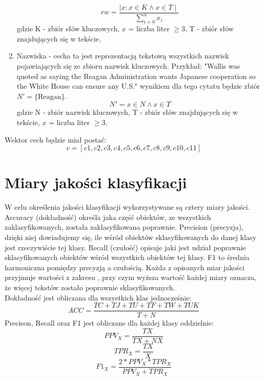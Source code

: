 \documentclass{article}
\begin{document}
\begin{enumerate}
        \begin{equation}
            rw = \frac{ \mid x : x \in K \land x \in T \mid}{ \sum_{i=0}^{n} x_i}
        \end{equation}
       gdzie K - zbiór słów kluczowych, \( x \) = liczba liter \( \geq 3 \), T - zbiór słów znajdujących się w tekście.
    \item Nazwiska - cecha ta jest reprezentacją tekstową wszystkich nazwisk pojawiających się ze zbioru nazwisk kluczowych. Przykład: "Wallis was quoted as saying the Reagan Administration wants Japanese cooperation so the White House can ensure any U.S." wynikiem dla tego cytatu będzie zbiór \( N' = \{ \text{Reagan} \} \).
    \begin{equation}
            N' =  x \in N \land x \in T
        \end{equation}
        gdzie N - zbiór nazwisk kluczowych, T - zbiór słów znajdujących się w tekście, \( x \) = liczba liter \( \geq 3 \).
\end{enumerate}

Wektor cech będzie miał postać: 
        \begin{equation}
          v = [c1, c2, c3, c4, c5, c6, c7, c8, c9, c10, c11]
        \end{equation}


\section{Miary jakości klasyfikacji}
W celu określenia jakości klasyfikacji wykorzystywane są cztery miary jakości. Accuracy (dokładność) określa jaka część obiektów, ze wszystkich zaklasyfikowanych, została zaklasyfikowana poprawnie. Precision (precyzja), dzięki niej dowiadujemy się, ile wśród obiektów sklasyfikowanych do danej klasy jest rzeczywiście tej klasy. Recall (czułość) opisuje jaki jest udział poprawnie sklasyfikowanych obiektów wśród wszystkich obiektów tej klasy. F1 to średnia harmoniczna pomiędzy precyzją a czułością. Każda z opisanych miar jakości przyjmuje wartości z zakresu \(<0, 1>\), przy czym wyższa wartość każdej miary oznacza, że więcej tekstów zostało poprawnie sklasyfikowanych.
\\
Dokładność jest obliczana dla wszystkich klas jednocześnie:
\begin{equation}
    ACC = \frac {TC + TJ + TU + TF + TW + TUK}{T + N}
\end{equation}
Precison, Recall oraz F1 jest obliczane dla każdej klasy oddzielnie:
\begin{equation}
    PPV_X = \frac {TX}{TX + NX}
\end{equation}
\begin{equation}
    TPR_X = \frac {TX}{X}
\end{equation}
\begin{equation}
    F1_X = \frac{2 * PPV_X * TPR_X}{PPV_X + TPR_X}
\end{equation}
\end{document}
